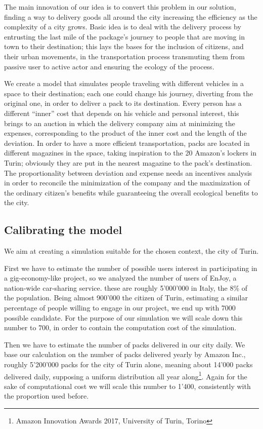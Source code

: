 \documentclass[11pt,a4paper]{article}
\begin{document}
The main innovation of our idea is to convert this problem in our solution, finding a way to delivery goods all around the city increasing the efficiency as the complexity of a city grows. 
Basic idea is to deal with the delivery process by entrusting the last mile of the package's journey to people that are moving in town to their destination; this lays the bases for the inclusion of citizens, and their urban movements, in the transportation process transmuting them from passive user to active actor and ensuring the ecology of the process. 

We create a model that simulates people traveling with different vehicles in a space to their destination; each one could change his journey, diverting from the original one, in order to deliver a pack to its destination. 
Every person has a different “inner'' cost that depends on his vehicle and personal interest, this brings to an auction in which the delivery company aim at minimizing the expenses, corresponding to the product of the inner cost and the length of the deviation. 
In order to have a more efficient transportation, packs are located in different magazines in the space, taking inspiration to the 20 Amazon's lockers in Turin; obviously they are put in the nearest magazine to the pack's destination. 
The proportionality between deviation and expense needs an incentives analysis in order to reconcile the minimization of the company and the maximization of the ordinary citizen's benefits while guaranteeing the overall ecological benefits to the city.

\newpage
\subsection{Calibrating the model}
We aim at creating a simulation suitable for the chosen context, the city of Turin.

First we have to estimate the number of possible users interest in participating in a gig-economy-like project, so we analyzed the number of users of EnJoy, a nation-wide car-sharing service. these are roughly 5'000'000 in Italy, the 8\% of the population. Being almost 900'000 the citizen of Turin, estimating a similar percentage of people willing to engage in our project, we end up with 7000 possible candidate. For the purpose of our simulation we will scale down this number to 700, in order to contain the computation cost of the simulation.

Then we have to estimate the number of packs delivered in our city daily. We base our calculation on the number of packs delivered yearly by Amazon Inc., roughly 5'200'000 packs for the city of Turin alone, meaning about 14'000 packs delivered daily, supposing a uniform distribution all year along\footnote{Amazon Innovation Awards 2017, University of Turin, Torino}. Again for the sake of computational cost we will scale this number to 1'400, consistently with the proportion used before.
\end{document}
